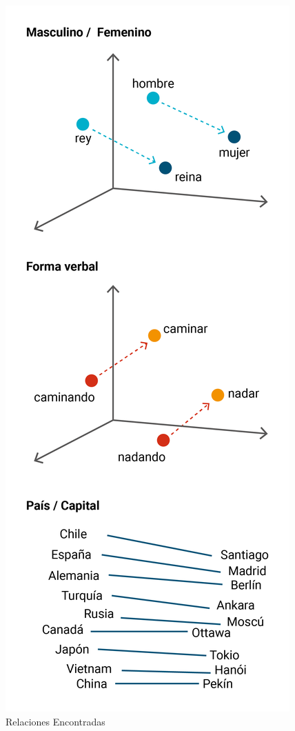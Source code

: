 \begin{figure}[h]
	\centering
	\includegraphics[scale=0.4]{pics/linear-relationships.png}
	\caption{Relaciones Encontradas}
	\label{fig_emb_rela}
\end{figure}

